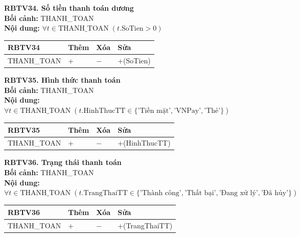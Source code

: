 \documentclass[11pt, a4paper]{article}
\begin{document}
\vspace{0.8em}
\textbf{RBTV34. Số tiền thanh toán dương} \\
\textbf{Bối cảnh:} THANH\_TOAN \\
\textbf{Nội dung:} $\forall t \in \text{THANH\_TOAN} \; (t.\text{SoTien} > 0)$

\vspace{0.3em}
\begin{small}
\begin{tabularx}{\textwidth}{| C{4.2cm} | C{2cm} | C{2cm} | Y |}
\hline
\textbf{RBTV34} & \textbf{Thêm} & \textbf{Xóa} & \textbf{Sửa} \\
\hline
THANH\_TOAN & + & $-$ & +(SoTien) \\
\hline
\end{tabularx}
\end{small}

\vspace{0.8em}
\textbf{RBTV35. Hình thức thanh toán} \\
\textbf{Bối cảnh:} THANH\_TOAN \\
\textbf{Nội dung:} $\forall t \in \text{THANH\_TOAN} \; (t.\text{HinhThucTT} \in \{\text{'Tiền mặt'}, \text{'VNPay'}, \text{'Thẻ'}\})$

\vspace{0.3em}
\begin{small}
\begin{tabularx}{\textwidth}{| C{4.2cm} | C{2cm} | C{2cm} | Y |}
\hline
\textbf{RBTV35} & \textbf{Thêm} & \textbf{Xóa} & \textbf{Sửa} \\
\hline
THANH\_TOAN & + & $-$ & +(HinhThucTT) \\
\hline
\end{tabularx}
\end{small}

\vspace{0.8em}
\textbf{RBTV36. Trạng thái thanh toán} \\
\textbf{Bối cảnh:} THANH\_TOAN \\
\textbf{Nội dung:} $\forall t \in \text{THANH\_TOAN} \; (t.\text{TrangThaiTT} \in \{\text{'Thành công'}, \text{'Thất bại'}, \text{'Đang xử lý'}, \text{'Đã hủy'}\})$

\vspace{0.3em}
\begin{small}
\begin{tabularx}{\textwidth}{| C{4.2cm} | C{2cm} | C{2cm} | Y |}
\hline
\textbf{RBTV36} & \textbf{Thêm} & \textbf{Xóa} & \textbf{Sửa} \\
\hline
THANH\_TOAN & + & $-$ & +(TrangThaiTT) \\
\hline
\end{tabularx}
\end{small}
\end{document}
